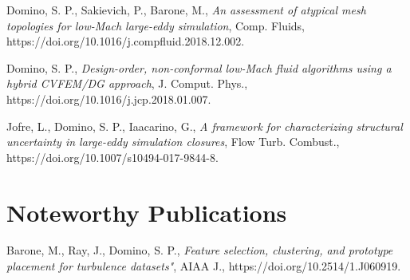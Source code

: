 \documentclass[letterpaper]{twentysecondcv_spd} %
\begin{document}
\begin{twentyshort}
	 {Domino, S. P., Sakievich, P., Barone, M., \textit{An assessment of atypical mesh topologies for low-Mach large-eddy simulation}, Comp. Fluids, https://doi.org/10.1016/j.compfluid.2018.12.002.}
	
	 {Domino, S. P., \textit{Design-order, non-conformal low-Mach fluid algorithms using a hybrid CVFEM/DG approach}, J. Comput. Phys., https://doi.org/10.1016/j.jcp.2018.01.007.}
	
	 {Jofre, L., Domino, S. P.,  Iaacarino, G., \textit{A framework for characterizing structural uncertainty in large-eddy simulation closures}, Flow Turb. Combust., https://doi.org/10.1007/s10494-017-9844-8.}

\end{twentyshort} 

\section{Noteworthy Publications}

\begin{twentyshort}


	 {Barone, M., Ray, J., Domino, S. P., \textit{Feature selection, clustering, and prototype placement for turbulence datasets"}, AIAA J., https://doi.org/10.2514/1.J060919.}
	
	
\end{twentyshort}

%
%
%
\end{document}

